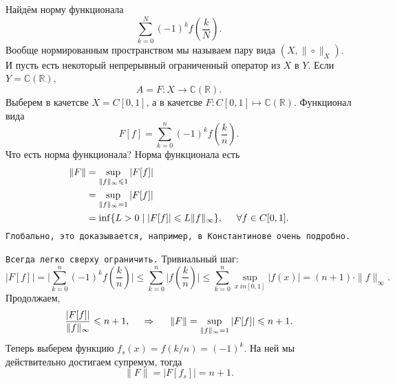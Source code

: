 Найдём норму функционала
\begin{equation*}
    \sum_{k=0}^N (-1)^k f\left(\frac{k}{N}\right).
\end{equation*}
Вообще нормированным пространством мы называем пару вида $(X, \|\circ\|_X)$. И пусть есть некоторый непрерывный ограниченный оператор из $X$ в $Y$. Если $Y = \mathbb{C}(\mathbb{R})$, 
\begin{equation*}
    A = F \colon  X \to \mathbb{C}(\mathbb{R}).
\end{equation*}
Выберем в качетсве $X = C[0, 1]$, а в качетсве $F \colon C[0, 1] \mapsto \mathbb{C}(\mathbb{R})$.
Функционал вида
\begin{equation*}
    F[f] = \sum_{k=0}^{n}(-1)^k f\left(\frac{k}{n}\right).
\end{equation*}
Что есть норма функционала? Норма функционала есть
\begin{align*}
    \|F\| 
    &= \sup_{\|f\|_{\infty} \leq 1} |F[f]| \\
    &= \sup_{\|f\|_{\infty} = 1} |F[f]| \\
    &= \inf \{
        L > 0 \mid |F[f]| \leq L\|f\|_\infty
    \}, 
    \hspace{5 mm} \forall f \in C[0, 1].
\end{align*}
\texttt{Глобально, это доказывается, например, в Константинове очень подробно.} 

\texttt{Всегда легко сверху ограничить.} Тривиальный шаг:
\begin{equation*}
    |F[f]| = \bigg|
        \sum_{k=0}^{n} (-1)^k f\left(
            \frac{k}{n}
        \right)
    \bigg| \leq \sum_{k=0}^{n} \bigg|
        f\left(\frac{k}{n}\right)
    \bigg| \leq \sum_{k=0}^{n} \sup_{x\ in [0,1 ]} |f(x)| = (n+1) \cdot \|f\|_{\infty}.
\end{equation*}
Продолжаем, 
\begin{equation*}
    \frac{|F[f]|}{\|f\|_{\infty}} \leq n + 1,
    \hspace{0.5cm} \Rightarrow \hspace{0.5cm}
    \|F\| = \sup_{\|f\|_{\infty} = 1} |F[f]| \leq n+1.
\end{equation*}
Теперь выберем функцию $f_s(x) = f(k/n) = (-1)^k$. На ней мы действительно достигаем супремум, тогда
\begin{equation*}
    \|F\| = |F[f_s]| = n+1.
\end{equation*}


